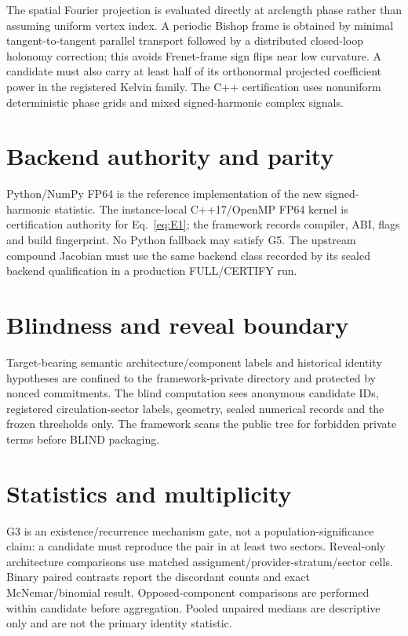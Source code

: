 \documentclass[11pt,a4paper]{article}
\begin{document}
The spatial Fourier projection is evaluated directly at arclength phase rather than assuming uniform vertex index. A periodic Bishop frame is obtained by minimal tangent-to-tangent parallel transport followed by a distributed closed-loop holonomy correction; this avoids Frenet-frame sign flips near low curvature. A candidate must also carry at least half of its orthonormal projected coefficient power in the registered Kelvin family. The C++ certification uses nonuniform deterministic phase grids and mixed signed-harmonic complex signals.

\section{Backend authority and parity}
Python/NumPy FP64 is the reference implementation of the new signed-harmonic statistic. The instance-local C++17/OpenMP FP64 kernel is certification authority for Eq.~\eqref{eq:E1}; the framework records compiler, ABI, flags and build fingerprint. No Python fallback may satisfy G5. The upstream compound Jacobian must use the same backend class recorded by its sealed backend qualification in a production FULL/CERTIFY run.

\section{Blindness and reveal boundary}
Target-bearing semantic architecture/component labels and historical identity hypotheses are confined to the framework-private directory and protected by nonced commitments. The blind computation sees anonymous candidate IDs, registered circulation-sector labels, geometry, sealed numerical records and the frozen thresholds only. The framework scans the public tree for forbidden private terms before BLIND packaging.

\section{Statistics and multiplicity}
G3 is an existence/recurrence mechanism gate, not a population-significance claim: a candidate must reproduce the pair in at least two sectors. Reveal-only architecture comparisons use matched assignment/provider-stratum/sector cells. Binary paired contrasts report the discordant counts and exact McNemar/binomial result. Opposed-component comparisons are performed within candidate before aggregation. Pooled unpaired medians are descriptive only and are not the primary identity statistic.
\end{document}
